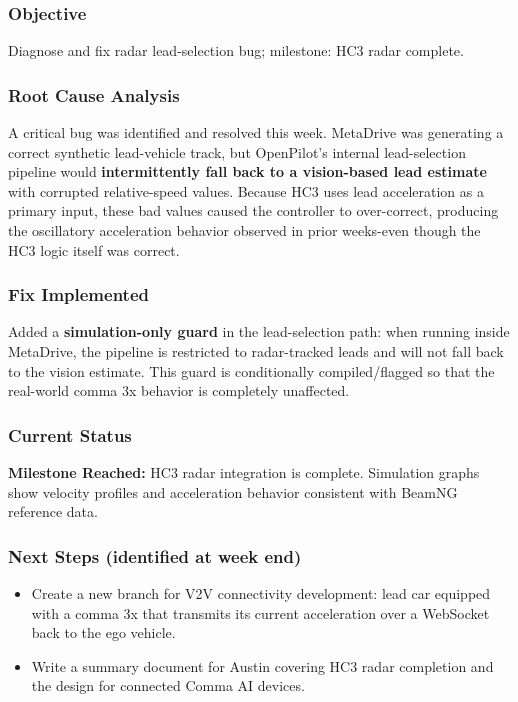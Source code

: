 \documentclass[12pt]{article}
\begin{document}
\subsubsection{Objective}
Diagnose and fix radar lead-selection bug; milestone: HC3 radar complete.

\subsubsection{Root Cause Analysis}

A critical bug was identified and resolved this week. MetaDrive was generating a correct synthetic lead-vehicle track, but OpenPilot's internal lead-selection pipeline would \textbf{intermittently fall back to a vision-based lead estimate} with corrupted relative-speed values. Because HC3 uses lead acceleration as a primary input, these bad values caused the controller to over-correct, producing the oscillatory acceleration behavior observed in prior weeks-even though the HC3 logic itself was correct.

\subsubsection{Fix Implemented}
Added a \textbf{simulation-only guard} in the lead-selection path: when running inside MetaDrive, the pipeline is restricted to radar-tracked leads and will not fall back to the vision estimate. This guard is conditionally compiled/flagged so that the real-world comma 3x behavior is completely unaffected.

\subsubsection{Current Status}

\begin{notebox}
\textbf{Milestone Reached:} HC3 radar integration is complete. Simulation graphs show velocity profiles and acceleration behavior consistent with BeamNG reference data.
\end{notebox}

\subsubsection{Next Steps (identified at week end)}
\begin{itemize}
  \item Create a new branch for V2V connectivity development: lead car equipped with a comma 3x that transmits its current acceleration over a WebSocket back to the ego vehicle.
  \item Write a summary document for Austin covering HC3 radar completion and the design for connected Comma AI devices.
\end{itemize}
\end{document}
